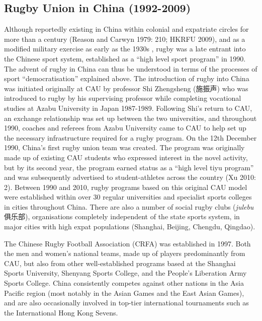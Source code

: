     \subsection{Rugby Union in China (1992-2009)}
Although reportedly existing in China within colonial and expatriate circles for more than a century (Reason and Carwyn 1979: 210; HKRFU 2009), and as a modified military exercise as early as the 1930s \citep[135]{Morris2004}, rugby was a late entrant into the Chinese sport system, established as a ``high level sport program'' in 1990.  The advent of rugby in China can thus be understood in terms of the processes of sport ``democratisation'' explained above.  The introduction of rugby into China was initiated originally at CAU by professor Shi Zhengsheng (施振声) who was introduced to rugby by his supervising professor while completing vocational studies at Azabu University in Japan 1987-1989.  Following Shi’s return to CAU, an exchange relationship was set up between the two universities, and throughout 1990, coaches and referees from Azabu University came to CAU to help set up the necessary infrastructure required for a rugby program.  On the 12th December 1990, China’s first rugby union team was created.  The program was originally made up of existing CAU students who expressed interest in the novel activity, but by its second year, the program earned status as a “high level tiyu program” and was subsequently advertised to student-athletes across the country (Xu 2010: 2).  Between 1990 and 2010, rugby programs based on this original CAU model were established within over 30 regular universities and specialist sports colleges in cities throughout China.  There are also a number of social rugby clubs (\textit{julebu} 俱乐部), organisations completely independent of the state sports system, in major cities with high expat populations (Shanghai, Beijing, Chengdu, Qingdao).

The Chinese Rugby Football Association (CRFA) was established in 1997. Both the men and women’s national teams, made up of players predominantly from CAU, but also from other well-established programs based at the Shanghai Sports University, Shenyang Sports College, and the People’s Liberation Army Sports College. China consistently competes against other nations in the Asia Pacific region (most notably in the Asian Games and the East Asian Games), and are also occasionally involved in top-tier international tournaments such as the International Hong Kong Sevens.

